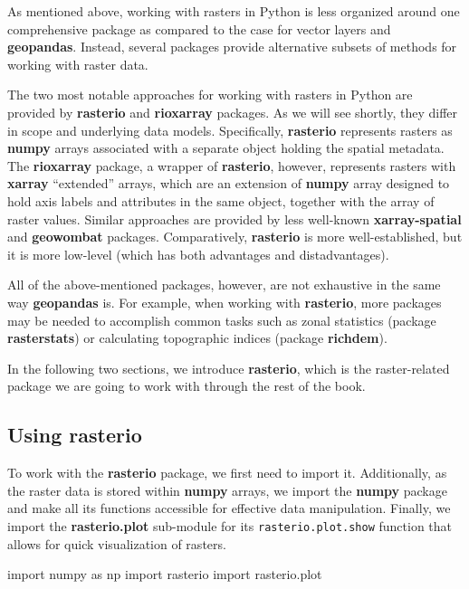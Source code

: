 \documentclass[
  letterpaper,
]{krantz}
\newenvironment{Shaded}{\begin{snugshade}}{\end{snugshade}}
\newcommand{\ImportTok}[1]{\textcolor[rgb]{0.00,0.46,0.62}{#1}}
\newcommand{\NormalTok}[1]{\textcolor[rgb]{0.00,0.23,0.31}{#1}}
\begin{document}
As mentioned above, working with rasters in Python is less organized
around one comprehensive package as compared to the case for vector
layers and \textbf{geopandas}. Instead, several packages provide
alternative subsets of methods for working with raster data.

The two most notable approaches for working with rasters in Python are
provided by \textbf{rasterio} and \textbf{rioxarray} packages. As we
will see shortly, they differ in scope and underlying data models.
Specifically, \textbf{rasterio} represents rasters as \textbf{numpy}
arrays associated with a separate object holding the spatial metadata.
The \textbf{rioxarray} package, a wrapper of \textbf{rasterio}, however,
represents rasters with \textbf{xarray} ``extended'' arrays, which are
an extension of \textbf{numpy} array designed to hold axis labels and
attributes in the same object, together with the array of raster values.
Similar approaches are provided by less well-known
\textbf{xarray-spatial} and \textbf{geowombat} packages. Comparatively,
\textbf{rasterio} is more well-established, but it is more low-level
(which has both advantages and distadvantages).

All of the above-mentioned packages, however, are not exhaustive in the
same way \textbf{geopandas} is. For example, when working with
\textbf{rasterio}, more packages may be needed to accomplish common
tasks such as zonal statistics (package \textbf{rasterstats}) or
calculating topographic indices (package \textbf{richdem}).

In the following two sections, we introduce \textbf{rasterio}, which is
the raster-related package we are going to work with through the rest of
the book.

\subsection{\texorpdfstring{Using
\textbf{rasterio}}{Using rasterio}}\label{sec-using-rasterio}

To work with the \textbf{rasterio} package, we first need to import it.
Additionally, as the raster data is stored within \textbf{numpy} arrays,
we import the \textbf{numpy} package and make all its functions
accessible for effective data manipulation. Finally, we import the
\textbf{rasterio.plot} sub-module for its \texttt{rasterio.plot.show}
function that allows for quick visualization of rasters.

\begin{Shaded}
\begin{Highlighting}[]
\ImportTok{import}\NormalTok{ numpy }\ImportTok{as}\NormalTok{ np}
\ImportTok{import}\NormalTok{ rasterio}
\ImportTok{import}\NormalTok{ rasterio.plot}
\end{Highlighting}
\end{Shaded}
\end{document}
